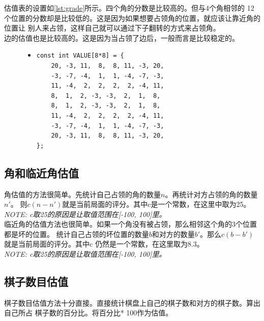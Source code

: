 \documentclass[a4paper]{article}
\begin{document}
估值表的设置如\autoref{lst:grade}所示。四个角的分数是比较高的。但与4个角相邻的
12个位置的分数却是比较低的。这是因为如果想要占领角的位置，就应该让靠近角的位置让
别人来占领，这样自己就可以通过下子翻转的方式来占领角。\\

边的估值也是比较高的。这是因为当占领了边后，一般而言是比较稳定的。\\

\begin{figure}[!hbt]
\begin{itemize}
\item[] \begin{lstlisting}[style=mycpp, label=lst:grade, caption=估值表的设置]
const int VALUE[8*8] = {
    20, -3, 11,  8,  8, 11, -3, 20,
    -3, -7, -4,  1,  1, -4, -7, -3,
    11, -4,  2,  2,  2,  2, -4, 11,
    8,  1,  2, -3, -3,  2,  1,  8,
    8,  1,  2, -3, -3,  2,  1,  8,
    11, -4,  2,  2,  2,  2, -4, 11,
    -3, -7, -4,  1,  1, -4, -7, -3,
    20, -3, 11,  8,  8, 11, -3, 20,
};
\end{lstlisting}
\end{itemize}
\end{figure}

\subsection{角和临近角估值}
角估值的方法很简单。先统计自己占领的角的数量$n$。再统计对方占领的角的数量$n'$。 
则$c(n - n')$就是当前局面的评分。其中c是一个常数，在这里中取为25。\\

\emph{NOTE: c取25的原因是让取值范围在[-100, 100]里。}\\

临近角的估值方法也很简单。如果一个角没有被占领，那么相邻这个角的3个位置都是坏的位置。
统计自己占领的坏位置的数量$b$和对方的数量$b'$。那么$c(b - b')$就是当前局面的评分。其中c
仍然是一个常数，在这里取为8.3。\\

\emph{NOTE: c取25的原因是让取值范围在[-100, 100]里。}\\

\subsection{棋子数目估值}
棋子数目估值方法十分直接。直接统计棋盘上自己的棋子数和对方的棋子数。算出自己所占
棋子数的百分比。将百分比* 100作为估值。\\
\end{document}
